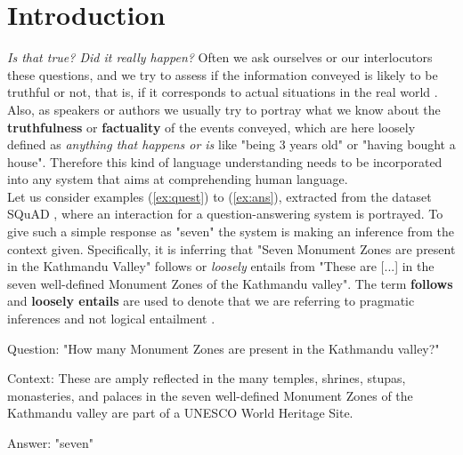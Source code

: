 \label{chap:intr}
\section{Introduction}
\textit{Is that true? Did it really happen?} Often we ask ourselves or our interlocutors these questions, and we try to assess if the information conveyed is likely to be truthful or not, that is, if it corresponds to actual situations in the real world \citep{sauri2009factbank}. Also, as speakers or authors we usually try to portray what we know about the \textbf{truthfulness} or \textbf{factuality} of the events conveyed, which are here loosely defined as \textit{anything that happens or is} like "being $3$ years old" or "having bought a house". Therefore this kind of language understanding needs to be incorporated into any system that aims at comprehending human language.\\

Let us consider examples (\ref{ex:quest}) to (\ref{ex:ans}), extracted from the dataset SQuAD \citep{rajpurkar2016squad}, where an interaction for a question-answering system is portrayed. To give such a simple response as "seven" the system is making an inference from the context given. Specifically, it is inferring that "Seven Monument Zones are present in the Kathmandu Valley" follows or \textit{loosely} entails from "These are [...] in the seven well-defined Monument Zones of the Kathmandu valley". The term \textbf{follows} and \textbf{loosely entails} are used to denote that we are referring to pragmatic inferences and not logical entailment \citep{manning2006local}.\\ 

\begin{exe}
        \ex\label{ex:quest}
        \begin{xlist}
                \item Question: "How many Monument Zones are present in the Kathmandu valley?" \label{ex:quest}
                \item Context: These are amply reflected in the many temples, shrines, stupas, monasteries, and palaces in the seven well-defined Monument Zones of the Kathmandu valley are part of a UNESCO World Heritage Site.\label{ex:cont}
                \item Answer: "seven"\label{ex:ans}
        \end{xlist}
\end{exe}

